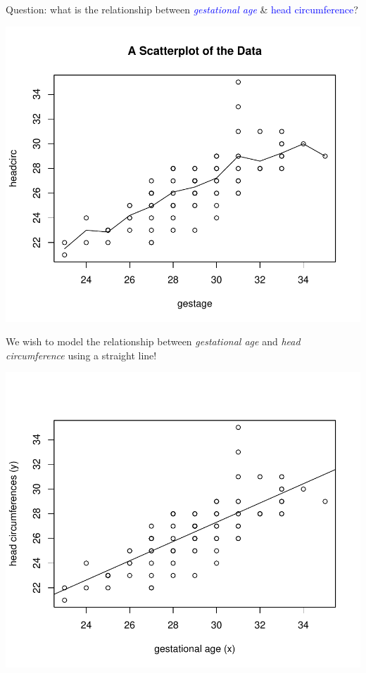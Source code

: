 \documentclass{article}\usepackage[]{graphicx}\usepackage[svgnames]{xcolor}
\makeatletter
\def\maxwidth{ %
  \ifdim\Gin@nat@width>\linewidth
    \linewidth
  \else
    \Gin@nat@width
  \fi
}
\newenvironment{knitrout}{}{} %
\makeatother
\begin{document}
Question: what is the relationship between \textcolor{Blue}{\emph{gestational age}} \& \textcolor{Blue}{head circumference}?
\begin{knitrout}
\color{fgcolor}

{\centering \includegraphics[width=\maxwidth]{figure/unnamed-chunk-11-1} 

}


\end{knitrout}
We wish to model the relationship between \emph{gestational age} and \emph{head
      circumference} using a straight line!
\begin{knitrout}
\color{fgcolor}

{\centering \includegraphics[width=\maxwidth]{figure/unnamed-chunk-12-1} 

}


\end{knitrout}
\end{document}

